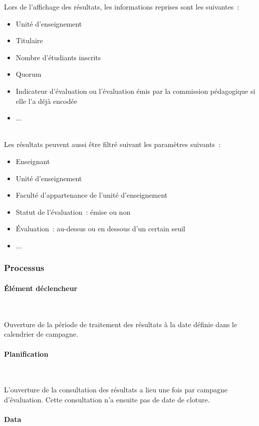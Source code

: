 \documentclass[a4paper,11pt]{report}
\begin{document}
Lors de l'affichage des résultats, les informations reprises sont les suivantes~:
\begin{itemize}
	\item Unité d'enseignement
	\item Titulaire
	\item Nombre d'étudiants inscrits
	\item Quorum
	\item Indicateur d'évaluation ou l'évaluation émis par la commission pédagogique si elle l'a déjà encodée
	\item ...
\end{itemize}
~\\

Les résultats peuvent aussi être filtré suivant les paramètres suivants~:
\begin{itemize}
	\item Enseignant
	\item Unité d'enseignement
	\item Faculté d'appartenance de l'unité d'enseignement
	\item Statut de l'évaluation~: émise ou non
	\item Évaluation~: au-dessus ou en dessous d'un certain seuil
	\item ...
\end{itemize}

\subsubsection{Processus}
\paragraph{Élément déclencheur}~\newline{}

Ouverture de la période de traitement des résultats à la date définie dans le calendrier de campagne.

\paragraph{Planification}~\newline{}

L'ouverture de la consultation des résultats a lieu une fois par campagne d'évaluation.
Cette consultation n'a ensuite pas de date de cloture.

\paragraph{Data}~\newline{}
\end{document}
